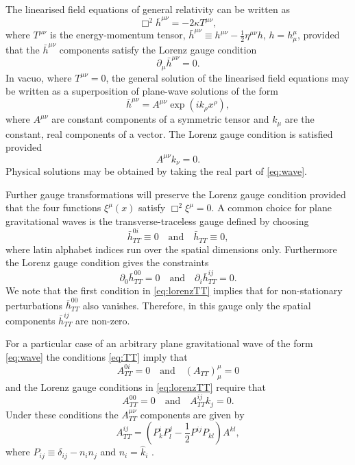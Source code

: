 The linearised field equations of general relativity can be written as
\begin{equation}
\Box^2\bar{h}^{\mu\nu} = -2\kappa T^{\mu\nu},
\end{equation}
where $T^{\mu\nu}$ is the energy-momentum tensor,
$\bar{h}^{\mu\nu} \equiv h^{\mu\nu} - \frac{1}{2}\eta^{\mu\nu}h$, $h =
h^\mu_\mu$, provided that the $\bar{h}^{\mu\nu}$ components satisfy
the Lorenz gauge condition
\begin{equation}
\partial_\mu\bar{h}^{\mu\nu} = 0.
\end{equation}
In vacuo, where $T^{\mu\nu} = 0$, the general solution of the
linearised field equations may be written as a superposition of
plane-wave solutions of the form
\begin{equation}\label{eq:wave}
\bar{h}^{\mu\nu} = A^{\mu\nu}\exp(ik_\rho x^\rho),
\end{equation}
where $A^{\mu\nu}$ are constant components of a symmetric tensor and
$k_\mu$ are the constant, real components of a vector. The Lorenz gauge
condition is satisfied provided
\begin{equation}
A^{\mu\nu}k_\nu = 0.
\end{equation}
Physical solutions may be obtained by taking the real part
of \eqref{eq:wave}.

Further gauge transformations will preserve the Lorenz gauge condition
provided that the four functions $\xi^\mu(x)$ satisfy $\Box^2\xi^\mu =
0$. A common choice for plane gravitational waves is the
transverse-traceless gauge defined by choosing
\begin{equation}\label{eq:TT}
\bar{h}^{0i}_{TT} \equiv 0 \,\,\,\,\,\, \text{and} \,\,\,\,\,\, \bar{h}_{TT} \equiv 0,
\end{equation}
where latin alphabet indices run over the spatial dimensions
only. Furthermore the Lorenz gauge condition gives the constraints
\begin{equation}\label{eq:lorenzTT}
\partial_0\bar{h}^{00}_{TT} = 0 \,\,\,\,\,\, \text{and} \,\,\,\,\,\, \partial_i\bar{h}^{ij}_{TT} = 0.
\end{equation}
We note that the first condition in \eqref{eq:lorenzTT} implies that
for non-stationary perturbations $\bar{h}^{00}_{TT}$ also
vanishes. Therefore, in this gauge only the spatial components
$\bar{h}^{ij}_{TT}$ are non-zero.

For a particular case of an arbitrary plane gravitational wave of the
form \eqref{eq:wave} the conditions \eqref{eq:TT} imply that
\begin{equation}
A^{0i}_{TT} = 0 \,\,\,\,\,\, \text{and} \,\,\,\,\,\, (A_{TT})^\mu_\mu = 0
\end{equation}
and the Lorenz gauge conditions in \eqref{eq:lorenzTT} require that
\begin{equation}
A^{00}_{TT} = 0 \,\,\,\,\,\, \text{and} \,\,\,\,\,\, A^{ij}_{TT}k_j = 0.
\end{equation}
Under these conditions the $A^{\mu\nu}_{TT}$ components are given by
\begin{equation}
A^{ij}_{TT} = (P^i_kP^j_l - \frac{1}{2}P^{ij}P_{kl})A^{kl},
\end{equation}
where $P_{ij} \equiv \delta_{ij} - n_in_j$ and $n_i = \hat{k}_i$ \cite{hobson}.

